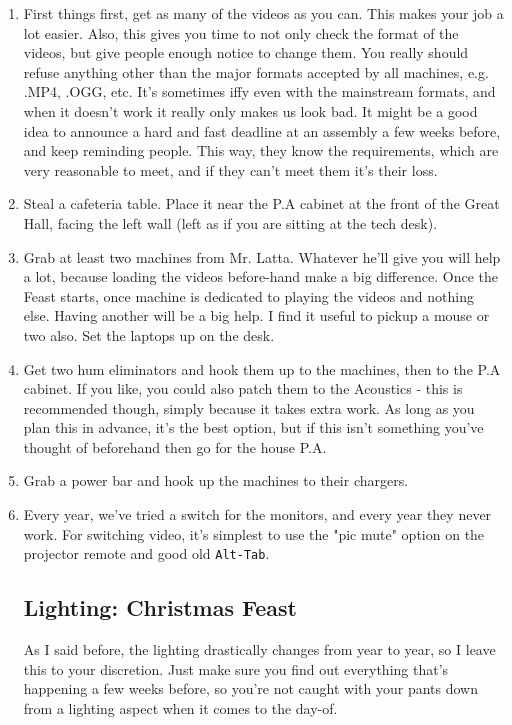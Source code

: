 \documentclass[11pt,a4paper]{book}
\begin{document}
\begin{enumerate}
\item First things first, get as many of the videos as you can. This makes your job a lot easier. Also, this gives you time to not only check the format of the videos, but give people enough notice to change them. You really should refuse anything other than the major formats accepted by all machines, e.g. .MP4, .OGG, etc. It's sometimes iffy even with the mainstream formats, and when it doesn't work it really only makes us look bad. It might be a good idea to announce a hard and fast deadline at an assembly a few weeks before, and keep reminding people. This way, they know the requirements, which are very reasonable to meet, and if they can't meet them it's their loss. 
\item Steal a cafeteria table. Place it near the P.A cabinet at the front of the Great Hall, facing the left wall (left as if you are sitting at the tech desk).
\item Grab at least two machines from Mr. Latta. Whatever he'll give you will help a lot, because loading the videos before-hand make a big difference. Once the Feast starts, once machine is dedicated to playing the videos and nothing else. Having another will be a big help. I find it useful to pickup a mouse or two also. Set the laptops up on the desk.
\item Get two hum eliminators and hook them up to the machines, then to the P.A cabinet. If you like, you could also patch them to the Acoustics - this is recommended though, simply because it takes extra work. As long as you plan this in advance, it's the best option, but if this isn't something you've thought of beforehand then go for the house P.A.
\item Grab a power bar and hook up the machines to their chargers.
\item Every year, we've tried a switch for the monitors, and every year they never work. For switching video, it's simplest to use the "pic mute" option on the projector remote and good old \texttt{Alt-Tab}.

\subsection{Lighting: Christmas Feast}
As I said before, the lighting drastically changes from year to year, so I leave this to your discretion. Just make sure you find out everything that's happening a few weeks before, so you're not caught with your pants down from a lighting aspect when it comes to the day-of.
\end{enumerate} 
\end{document}
